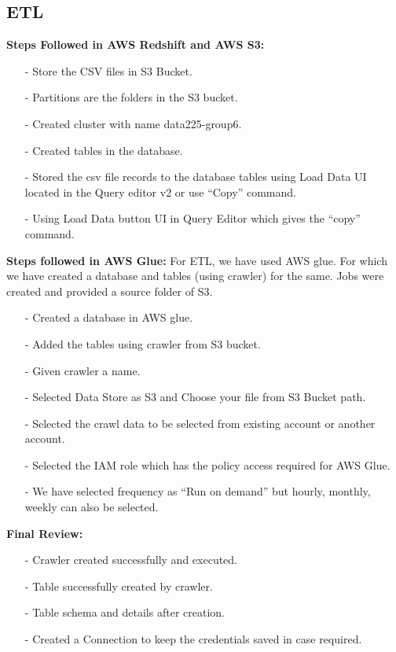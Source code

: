 \documentclass[11pt,journal,compsoc]{IEEEtran}
\begin{document}
\subsection{ETL}
\textbf{Steps Followed in AWS Redshift and AWS S3:}
\begin{itemize}
    \item[-] Store the CSV files in S3 Bucket.
    \item[-] Partitions are the folders in the S3 bucket.
    \item[-] Created cluster with name data225-group6.
    \item[-] Created tables in the database.
    \item[-] Stored the csv file records to the database tables using Load Data UI located in the Query editor v2 or use “Copy” command.
    \item[-] Using Load Data button UI in Query Editor which gives the “copy” command.
\end{itemize}
\textbf{Steps followed in AWS Glue:}
\newline For ETL, we have used AWS glue. For which we have created a database and tables (using crawler) for the same. Jobs were created and provided a source folder of S3.
\begin{itemize}
    \item[-] Created a database in AWS glue.
    \item[-] Added the tables using crawler from S3 bucket. 
    \item[-] Given crawler a name.
    \item[-] Selected Data Store as S3 and Choose your file from S3 Bucket path.
    \item[-] Selected the crawl data to be selected from existing account or another account.
    \item[-] Selected the IAM role which has the policy access required for AWS Glue.
    \item[-] We have selected frequency as “Run on demand” but hourly, monthly, weekly can also be selected.
\end{itemize}
\textbf{Final Review:}
\begin{itemize}
    \item[-] Crawler created successfully and executed.
    \item[-] Table successfully created by crawler.
    \item[-] Table schema and details after creation.
    \item[-] Created a Connection to keep the credentials saved in case required. 
\end{itemize}
\end{document}

